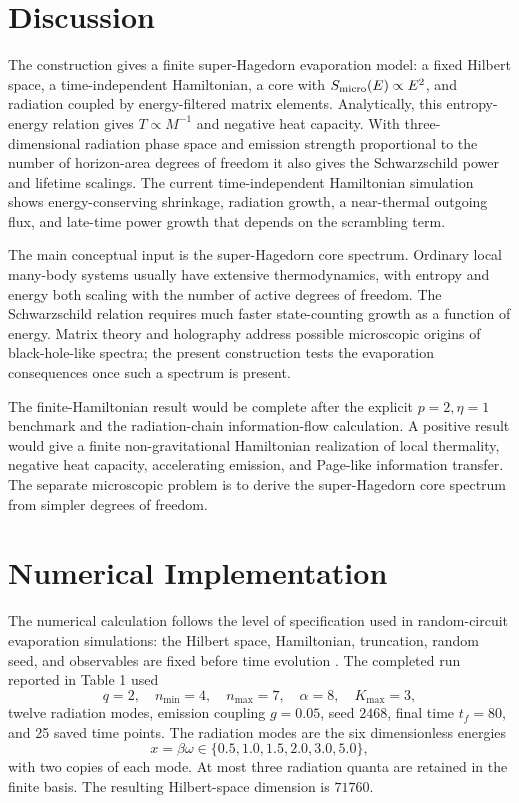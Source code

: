 \documentclass[12pt]{article}
\newcommand{\Smicro}{S_{\rm micro}}
\begin{document}
\section{Discussion}

The construction gives a finite super-Hagedorn evaporation model: a fixed
Hilbert space, a time-independent Hamiltonian, a core with
$\Smicro(E)\propto E^2$, and radiation coupled by energy-filtered matrix
elements.  Analytically, this entropy-energy relation gives $T\propto M^{-1}$
and negative heat capacity.  With three-dimensional radiation phase space and
emission strength proportional to the number of horizon-area degrees of
freedom it also gives the Schwarzschild power and lifetime scalings.  The
current time-independent Hamiltonian simulation shows energy-conserving
shrinkage, radiation growth, a near-thermal outgoing flux, and late-time power
growth that depends on the scrambling term.

The main conceptual input is the super-Hagedorn core spectrum.  Ordinary local
many-body systems usually have extensive thermodynamics, with entropy and
energy both scaling with the number of active degrees of freedom.  The
Schwarzschild relation requires much faster state-counting growth as a
function of energy.  Matrix theory and holography address possible microscopic
origins of black-hole-like spectra; the present construction tests the
evaporation consequences once such a spectrum is present.

The finite-Hamiltonian result would be complete after the explicit
$p=2,\eta=1$ benchmark and the radiation-chain information-flow calculation.  A
positive result would give a finite non-gravitational Hamiltonian realization
of local thermality, negative heat capacity, accelerating emission, and
Page-like information transfer.  The separate microscopic problem is to derive
the super-Hagedorn core spectrum from simpler degrees of freedom.

\appendix

\section{Numerical Implementation}

The numerical calculation follows the level of specification used in
random-circuit evaporation simulations: the Hilbert space, Hamiltonian,
truncation, random seed, and observables are fixed before time evolution
\cite{PiroliSunderhaufQi2020}.  The completed run reported in Table 1 used
\begin{equation}
    q=2,\quad n_{\min}=4,\quad n_{\max}=7,\quad
    \alpha=8,\quad K_{\max}=3,
\end{equation}
twelve radiation modes, emission coupling $g=0.05$, seed $2468$, final time
$t_f=80$, and 25 saved time points.  The radiation modes are the six
dimensionless energies
\begin{equation}
    x=\beta\omega\in \{0.5,1.0,1.5,2.0,3.0,5.0\},
\end{equation}
with two copies of each mode.  At most three radiation quanta are retained in
the finite basis.  The resulting Hilbert-space dimension is $71760$.
\end{document}
